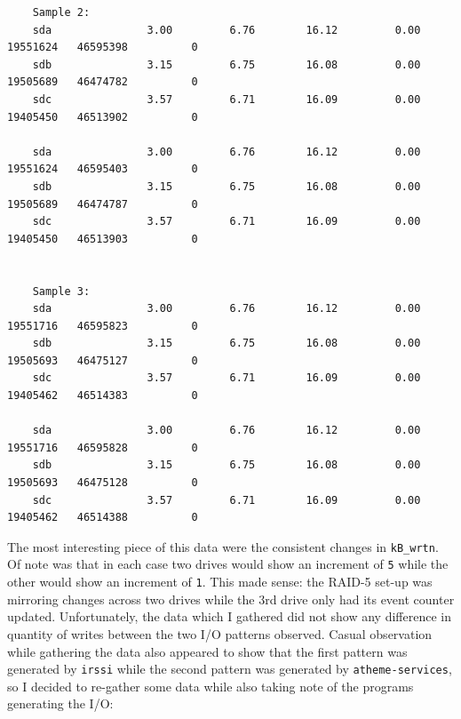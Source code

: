 \documentclass{article}
\begin{document}
\begin{verbatim}
	Sample 2:
	sda               3.00         6.76        16.12         0.00   19551624   46595398          0
	sdb               3.15         6.75        16.08         0.00   19505689   46474782          0
	sdc               3.57         6.71        16.09         0.00   19405450   46513902          0

	sda               3.00         6.76        16.12         0.00   19551624   46595403          0
	sdb               3.15         6.75        16.08         0.00   19505689   46474787          0
	sdc               3.57         6.71        16.09         0.00   19405450   46513903          0


	Sample 3:
	sda               3.00         6.76        16.12         0.00   19551716   46595823          0
	sdb               3.15         6.75        16.08         0.00   19505693   46475127          0
	sdc               3.57         6.71        16.09         0.00   19405462   46514383          0

	sda               3.00         6.76        16.12         0.00   19551716   46595828          0
	sdb               3.15         6.75        16.08         0.00   19505693   46475128          0
	sdc               3.57         6.71        16.09         0.00   19405462   46514388          0
\end{verbatim}
The most interesting piece of this data were the consistent changes in \texttt{kB_wrtn}.  Of note was that in each case two drives would show an increment of \texttt{5} while the other would show an increment of \texttt{1}.  This made sense: the RAID-5 set-up was mirroring changes across two drives while the 3rd drive only had its event counter updated.  Unfortunately, the data which I gathered did not show any difference in quantity of writes between the two I/O patterns observed.  Casual observation while gathering the data also appeared to show that the first pattern was generated by \texttt{irssi} while the second pattern was generated by \texttt{atheme-services}, so I decided to re-gather some data while also taking note of the programs generating the I/O:
\end{document}
